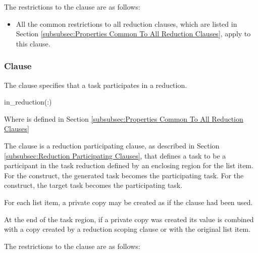 \restrictions
The restrictions to the  clause are as follows:

\begin{itemize}
\item All the common restrictions to all reduction clauses, which are listed in
Section \ref{subsubsec:Properties Common To All Reduction Clauses}, apply to
this clause.
\end{itemize}











\subsubsection{ Clause}
\label{subsubsec:in_reduction clause}
\summary
The  clause specifies that a task participates in a reduction.

\syntax
\begin{ompSyntax}
in_reduction(:)
\end{ompSyntax}
Where  is defined in Section \ref{subsubsec:Properties Common To All Reduction Clauses}

\descr
The  clause is a reduction participating clause, as
described in Section \ref{subsubsec:Reduction Participating Clauses}, that
defines a task to be a participant in the task reduction defined by an
enclosing  region for the list item. For the 
construct, the generated task becomes the participating task. For the
 construct, the target task becomes the participating task.

For each list item, a private copy may be created as if the 
clause had been used.

At the end of the task region, if a private copy was created its value is
combined with a copy created by a reduction scoping clause or with the original
list item.

\restrictions
The restrictions to the  clause are as follows:

